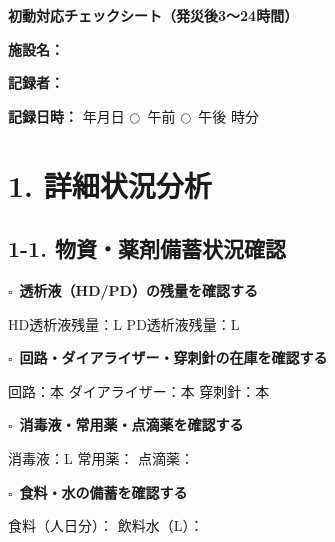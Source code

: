 \documentclass[a4paper,12pt]{jarticle}
\newcommand{\checkbox}{$\square$\ }
\newcommand{\underlinespace}[1]{\underline{\hspace{#1}}}
\newcommand{\circlecheck}{$\bigcirc$\ }
\begin{document}
\begin{center}
{\Large\textbf{初動対応チェックシート（発災後3～24時間）}}
\end{center}
\vspace{5mm}

\noindent
\textbf{施設名：} \underlinespace{8cm}

\vspace{3mm}

\noindent
\textbf{記録者：} \underlinespace{4cm}

\vspace{3mm}

\noindent
\textbf{記録日時：} \underlinespace{2cm}年\underlinespace{1cm}月\underlinespace{1cm}日 \quad \circlecheck 午前 \quad \circlecheck 午後 \quad \underlinespace{1cm}時\underlinespace{1cm}分

\vspace{5mm}

\section*{1. 詳細状況分析}

\subsection*{1-1. 物資・薬剤備蓄状況確認}

\checkbox \textbf{透析液（HD/PD）の残量を確認する}

\quad HD透析液残量：\underlinespace{3cm}L \quad PD透析液残量：\underlinespace{3cm}L

\vspace{3mm}

\checkbox \textbf{回路・ダイアライザー・穿刺針の在庫を確認する}

\quad 回路：\underlinespace{3cm}本 \quad ダイアライザー：\underlinespace{3cm}本 \quad 穿刺針：\underlinespace{3cm}本

\vspace{3mm}

\checkbox \textbf{消毒液・常用薬・点滴薬を確認する}

\quad 消毒液：\underlinespace{3cm}L \quad 常用薬：\underlinespace{6cm} \quad 点滴薬：\underlinespace{6cm}

\vspace{3mm}

\checkbox \textbf{食料・水の備蓄を確認する}

\quad 食料（人日分）：\underlinespace{3cm} \quad 飲料水（L）：\underlinespace{3cm}
\end{document}
